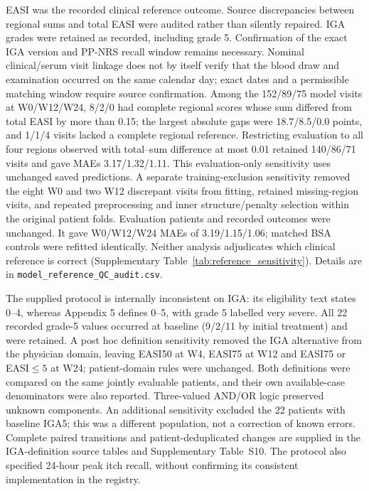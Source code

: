 \documentclass[10pt,a4paper]{article}
\begin{document}
EASI was the recorded clinical reference outcome. Source discrepancies between regional sums and total EASI were audited rather than silently repaired. IGA grades were retained as recorded, including grade 5. Confirmation of the exact IGA version and PP-NRS recall window remains necessary. Nominal clinical/serum visit linkage does not by itself verify that the blood draw and examination occurred on the same calendar day; exact dates and a permissible matching window require source confirmation. Among the 152/89/75 model visits at W0/W12/W24, 8/2/0 had complete regional scores whose sum differed from total EASI by more than 0.15; the largest absolute gaps were 18.7/8.5/0.0 points, and 1/1/4 visits lacked a complete regional reference. Restricting evaluation to all four regions observed with total--sum difference at most 0.01 retained 140/86/71 visits and gave MAEs 3.17/1.32/1.11. This evaluation-only sensitivity uses unchanged saved predictions. A separate training-exclusion sensitivity removed the eight W0 and two W12 discrepant visits from fitting, retained missing-region visits, and repeated preprocessing and inner structure/penalty selection within the original patient folds. Evaluation patients and recorded outcomes were unchanged. It gave W0/W12/W24 MAEs of 3.19/1.15/1.06; matched BSA controls were refitted identically. Neither analysis adjudicates which clinical reference is correct (Supplementary Table~\ref{tab:reference_sensitivity}). Details are in \texttt{model\_reference\_QC\_audit.csv}.

The supplied protocol is internally inconsistent on IGA: its eligibility text states 0--4, whereas Appendix 5 defines 0--5, with grade 5 labelled very severe. All 22 recorded grade-5 values occurred at baseline (9/2/11 by initial treatment) and were retained. A post hoc definition sensitivity removed the IGA alternative from the physician domain, leaving EASI50 at W4, EASI75 at W12 and EASI75 or EASI$\leq5$ at W24; patient-domain rules were unchanged. Both definitions were compared on the same jointly evaluable patients, and their own available-case denominators were also reported. Three-valued AND/OR logic preserved unknown components. An additional sensitivity excluded the 22 patients with baseline IGA5; this was a different population, not a correction of known errors. Complete paired transitions and patient-deduplicated changes are supplied in the IGA-definition source tables and Supplementary Table~S10. The protocol also specified 24-hour peak itch recall, without confirming its consistent implementation in the registry.
\end{document}
